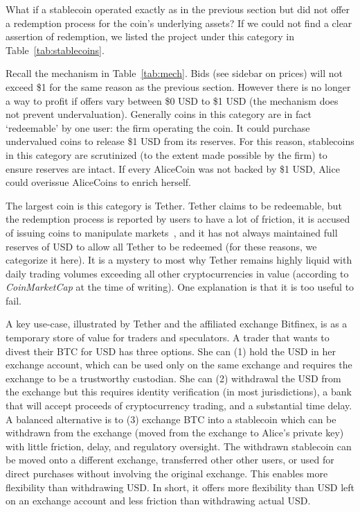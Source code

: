 What if a stablecoin operated exactly as in the previous section but did not offer a redemption process for the coin's underlying assets? If we could not find a clear assertion of redemption, we listed the project under this category in Table~\ref{tab:stablecoins}.

Recall the mechanism in Table~\ref{tab:mech}. Bids (see sidebar on prices) will not exceed \$1 for the same reason as the previous section. However there is no longer a way to profit if offers vary between \$0 USD to \$1 USD (\ie the mechanism does not prevent undervaluation). Generally coins in this category are in fact `redeemable' by one user: the firm operating the coin. It could purchase undervalued coins to release \$1 USD from its reserves. For this reason, stablecoins in this category are scrutinized (to the extent made possible by the firm) to ensure reserves are intact. If every AliceCoin was not backed by \$1 USD, Alice could overissue AliceCoins to enrich herself.

The largest coin is this category is Tether. Tether claims to be redeemable, but the redemption process is reported by users to have a lot of friction, it is accused of issuing coins to manipulate markets~\cite{griffin2018bitcoin}, and it has not always maintained full reserves of USD to allow all Tether to be redeemed (for these reasons, we categorize it here). It is a mystery to most why Tether remains highly liquid with daily trading volumes exceeding all other cryptocurrencies in value (according to \textit{CoinMarketCap} at the time of writing). One explanation is that it is too useful to fail.

A key use-case, illustrated by Tether and the affiliated exchange Bitfinex, is as a temporary store of value for traders and speculators. A trader that wants to divest their BTC for USD has three options. She can (1) hold the USD in her exchange account, which can be used only on the same exchange and requires the exchange to be a trustworthy custodian. She can (2) withdrawal the USD from the exchange but this requires identity verification (in most jurisdictions), a bank that will accept proceeds of cryptocurrency trading, and a substantial time delay. A balanced alternative is to (3) exchange BTC into a stablecoin which can be withdrawn from the exchange (\ie moved from the exchange to Alice's private key) with little friction, delay, and regulatory oversight. The withdrawn stablecoin can be moved onto a different exchange, transferred other other users, or used for direct purchases without involving the original exchange. This enables more flexibility than withdrawing USD. In short, it offers more flexibility than USD left on an exchange account and less friction than withdrawing actual USD.
 

